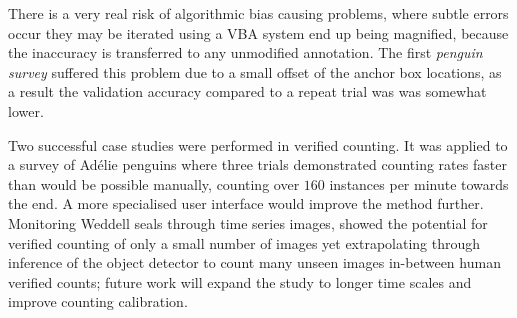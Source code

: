There is a very real risk of algorithmic bias causing problems, where subtle errors occur they may be iterated using a \gls{VBA} system end up being magnified, because the inaccuracy is transferred to any unmodified  annotation. The first \emph{penguin survey} suffered this problem due to a small offset of the anchor box locations, as a result the validation accuracy compared to a repeat trial was was somewhat lower.

Two successful case studies were performed in verified counting. It was applied to a survey of Ad\'elie penguins where three trials demonstrated counting rates faster than would be possible manually, counting over $160$ instances per minute towards the end. A more specialised user interface would improve the method further. Monitoring Weddell seals through time series images, showed the potential for verified counting of only a small number of images yet extrapolating through inference of the object detector to count many unseen images in-between human verified counts; future work will expand the study to longer time scales and improve counting calibration.